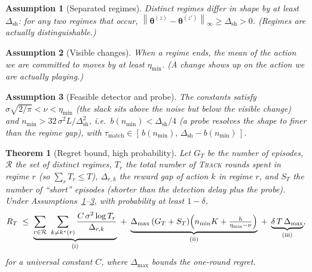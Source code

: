 \documentclass[11pt]{article}
\newtheorem{assumption}{Assumption}
\newtheorem{theorem}{Theorem}
\newcommand{\norm}[1]{\left\lVert #1 \right\rVert}
\newcommand{\TRACK}{\textsc{Track}\xspace}
\begin{document}
\begin{assumption}[Separated regimes]
\label{ass:sep}
Distinct regimes differ in shape by at least $\Delta_{\mathrm{sh}}$: for any two regimes that
occur, $\norm{\bm\theta^{(z)}-\bm\theta^{(z')}}_\infty\ge\Delta_{\mathrm{sh}}>0$. (Regimes are
actually distinguishable.)
\end{assumption}

\begin{assumption}[Visible changes]
\label{ass:visibility}
When a regime ends, the mean of the action we are committed to moves by at least $\eta_{\min}$.
(A change shows up on the action we are actually playing.)
\end{assumption}

\begin{assumption}[Feasible detector and probe]
\label{ass:detect}
The constants satisfy $\sigma\sqrt{2/\pi} < \nu < \eta_{\min}$ (the slack sits above the noise but
below the visible change) and $n_{\min} > 32\,\sigma^2 L/\Delta_{\mathrm{sh}}^2$, i.e.\
$b(n_{\min}) < \Delta_{\mathrm{sh}}/4$ (a probe resolves the shape to finer than the regime gap),
with $\tau_{\mathrm{match}}\in[\,b(n_{\min}),\,\Delta_{\mathrm{sh}}-b(n_{\min})\,]$.
\end{assumption}

\begin{theorem}[Regret bound, high probability]
\label{thm:main}
Let $G_T$ be the number of episodes, $\mathcal R$ the set of distinct regimes, $T_r$ the total
number of \TRACK rounds spent in regime $r$ (so $\sum_r T_r\le T$), $\Delta_{r,k}$ the reward gap
of action $k$ in regime $r$, and $S_T$ the number of ``short'' episodes (shorter than the
detection delay plus the probe). Under Assumptions~\ref{ass:sep}--\ref{ass:detect}, with
probability at least $1-\delta$,
\begin{equation}
   R_T \;\le\;
   \underbrace{\sum_{r\in\mathcal R}\ \sum_{k\ne k^\star(r)} \frac{C\,\sigma^2 \log T_r}{\Delta_{r,k}}}_{\text{(i)}}
   \;+\;
   \underbrace{\Delta_{\max}\,(G_T + S_T)\Big(n_{\min}K + \tfrac{h}{\eta_{\min}-\nu}\Big)}_{\text{(ii)}}
   \;+\;
   \underbrace{\delta\,T\,\Delta_{\max}}_{\text{(iii)}},
   \notag
\end{equation}
for a universal constant $C$, where $\Delta_{\max}$ bounds the one-round regret.
\end{theorem}
\end{document}
